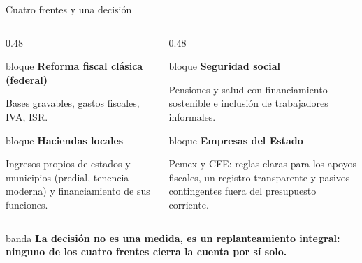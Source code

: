 \documentclass[aspectratio=169,12pt]{beamer}
\newcommand{\frente}[2]{%
    \begin{beamercolorbox}[wd=\linewidth,sep=5pt,rounded=false]{bloque}
      {\color{petroleo}\bfseries #1}\par\vspace{0.2em}\small #2
    \end{beamercolorbox}}
\begin{document}
\begin{frame}{Cuatro frentes y una decisión}
  \vspace{-0.4em}
  \begin{columns}[T]
    \begin{column}{0.48\textwidth}
      \frente{Reforma fiscal clásica (federal)}{Bases gravables, gastos fiscales, IVA, ISR.}\par\vspace{0.35em}
      \frente{Haciendas locales}{Ingresos propios de estados y municipios (predial, tenencia moderna) y financiamiento de sus funciones.}
    \end{column}
    \begin{column}{0.48\textwidth}
      \frente{Seguridad social}{Pensiones y salud con financiamiento sostenible e inclusión de trabajadores informales.}\par\vspace{0.35em}
      \frente{Empresas del Estado}{Pemex y CFE: reglas claras para los apoyos fiscales, un registro transparente y pasivos contingentes fuera del presupuesto corriente.}
    \end{column}
  \end{columns}
  \vfill
  \begin{beamercolorbox}[wd=\textwidth,sep=8pt,center]{banda}
    \bfseries La decisión no es una medida, es un replanteamiento integral:\\
    ninguno de los cuatro frentes cierra la cuenta por sí solo.
  \end{beamercolorbox}
  \vspace*{-0.6em}
\end{frame}
\end{document}
